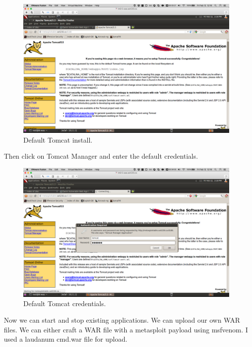 \documentclass{article}
\begin{document}
\begin{figure}[h!]
	\includegraphics[width=\linewidth]{images/tomcat-metasploitable.png}
	\caption{Default Tomcat install.}
	\label{fig:tomcat-injection1}
\end{figure}

\newpage
Then click on Tomcat Manager and enter the default credentials.

\begin{figure}[h!]
	\includegraphics[width=\linewidth]{images/tomcat-metasploitable-credentials.png}
	\caption{Default Tomcat credentials.}
	\label{fig:tomcat-injection2}
\end{figure}

\newpage
Now we can start and stop existing applications. We can upload our own WAR files.
We can either craft a WAR file with a metasploit payload using msfvenom. 
I used a laudanum cmd.war file for upload.

\end{document}
